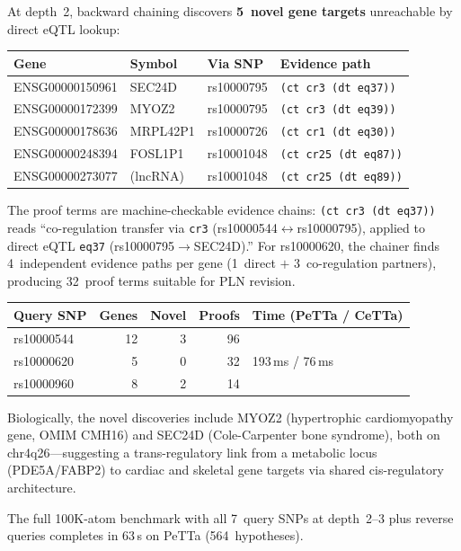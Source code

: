 \documentclass[11pt]{article}
\newcommand{\code}[1]{\texttt{#1}}
\newcommand{\PeTTa}{\textup{PeTTa}}
\newcommand{\CeTTa}{\textup{CeTTa}}
\begin{document}
At depth~2, backward chaining discovers \textbf{5~novel gene targets}
unreachable by direct eQTL lookup:

\begin{center}
\begin{tabular}{llll}
\toprule
Gene & Symbol & Via SNP & Evidence path \\
\midrule
ENSG00000150961 & SEC24D  & rs10000795 & \code{(ct cr3 (dt eq37))} \\
ENSG00000172399 & MYOZ2   & rs10000795 & \code{(ct cr3 (dt eq39))} \\
ENSG00000178636 & MRPL42P1 & rs10000726 & \code{(ct cr1 (dt eq30))} \\
ENSG00000248394 & FOSL1P1  & rs10001048 & \code{(ct cr25 (dt eq87))} \\
ENSG00000273077 & (lncRNA)  & rs10001048 & \code{(ct cr25 (dt eq89))} \\
\bottomrule
\end{tabular}
\end{center}

The proof terms are machine-checkable evidence chains: \code{(ct cr3
(dt eq37))} reads ``co-regulation transfer via \code{cr3}
(rs10000544$\leftrightarrow$rs10000795), applied to direct eQTL
\code{eq37} (rs10000795$\to$SEC24D).''  For rs10000620, the chainer
finds 4~independent evidence paths per gene (1~direct $+$
3~co-regulation partners), producing 32~proof terms suitable for PLN
revision.

\begin{center}
\begin{tabular}{lrrrl}
\toprule
Query SNP & Genes & Novel & Proofs & Time (\PeTTa{} / \CeTTa{}) \\
\midrule
rs10000544 & 12 & 3 & 96  & \multirow{3}{*}{193\,ms / 76\,ms} \\
rs10000620 &  5 & 0 & 32  & \\
rs10000960 &  8 & 2 & 14  & \\
\bottomrule
\end{tabular}
\end{center}

Biologically, the novel discoveries include MYOZ2 (hypertrophic
cardiomyopathy gene, OMIM CMH16) and SEC24D (Cole-Carpenter bone
syndrome), both on chr4q26---suggesting a trans-regulatory link from a
metabolic locus (PDE5A/FABP2) to cardiac and skeletal gene targets via
shared cis-regulatory architecture.

The full 100K-atom benchmark with all 7~query SNPs at depth~2--3
plus reverse queries completes in 63\,s on \PeTTa{} (564~hypotheses).
\end{document}
